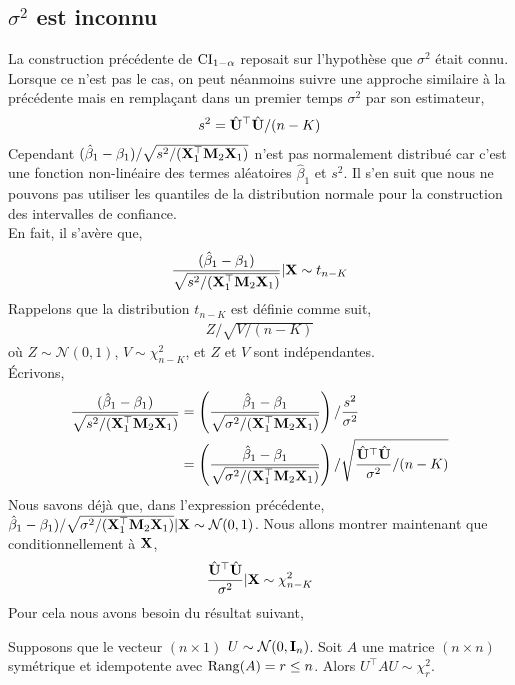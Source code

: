 \subsection{$\sigma^2$ est inconnu}
La construction précédente de $\mathrm{CI}_{1-\alpha}$ reposait sur l'hypothèse que $\sigma^2$ était connu. Lorsque ce n'est pas le cas, on peut néanmoins suivre une approche similaire à la précédente mais en remplaçant dans un premier temps $\sigma^2$ par son estimateur,
\begin{align*}
s^2 = \hat{\mathbf U}^\top \hat{\mathbf U}/(n-K)
\end{align*}
Cependant $(\hat{\beta}_1-\beta_1)/
\sqrt{s^2/(\mathbf X_1^\top\mathbf M_2\mathbf X_1)}$ n'est pas normalement distribué car c'est une fonction non-linéaire des termes aléatoires $\hat{\beta}_1$ et $s^2$. Il s'en suit que nous ne pouvons pas utiliser les quantiles de la distribution normale pour la construction des intervalles de confiance.\\
En fait, il s'avère que,
\begin{align}
\frac{(\hat{\beta} _1-\beta_1)}{\sqrt{s^2/(\mathbf X_1^\top\mathbf M_2\mathbf X_1)}}
| \mathbf X
\sim t_{n-K}
\label{eq22}
\end{align}
Rappelons que la	 distribution $t_{n-K}$ est définie comme suit,
\begin{align*}
Z/\sqrt{V/(n-K)}
\end{align*}
où $Z\sim \mathcal{N}(0,1)$, $V\sim \chi^2_{n-K}$, et $Z$ et $V$ sont indépendantes.\\ \'Ecrivons,
\begin{align}
\frac{(\hat{\beta}_1-\beta_1)}{\sqrt{s^2/(\mathbf X_1^\top\mathbf M_2\mathbf X_1)}}
&= \left(
\frac{\hat{\beta}_1-\beta_1}{\sqrt{\sigma^2/(\mathbf X_1^\top\mathbf M_2\mathbf X_1)}}
\right)/
\frac{s^2}{\sigma^2}\nonumber \\
&= 
 \left(
\frac{\hat{\beta}_1-\beta_1}{\sqrt{\sigma^2/(\mathbf X_1^\top\mathbf M_2\mathbf X_1)}}
\right)/
\sqrt{\frac{\hat{\mathbf U}^\top\hat{\mathbf U}}{\sigma^2}/(n-K)}
\label{eq32}
\end{align}
Nous savons déjà que, dans l'expression précédente, $\hat{\beta} _1-\beta_1)/\sqrt{\sigma^2/(\mathbf X_1^\top\mathbf M_2\mathbf X_1)} |\mathbf X \sim \mathcal{N}(0,1)$. Nous allons montrer maintenant que conditionnellement à $\mathbf X$,
\begin{align}
\frac{\hat{\mathbf U}^\top\hat{\mathbf U}}{\sigma^2} | \mathbf X\sim\chi^2_{n-K}
\label{eq23}
\end{align}
Pour cela nous avons besoin du résultat suivant,
\begin{lemme}
Supposons que le vecteur $(n\times 1)$ $U\sim\mathcal{N}(0, \mathbf{I}_n)$. Soit $A$ une matrice $(n\times n)$ symétrique et idempotente avec $\mathrm{Rang}(A) = r \leq n$. Alors $U^\top A U \sim \chi^2_r$.
\label{le1}
\end{lemme}
